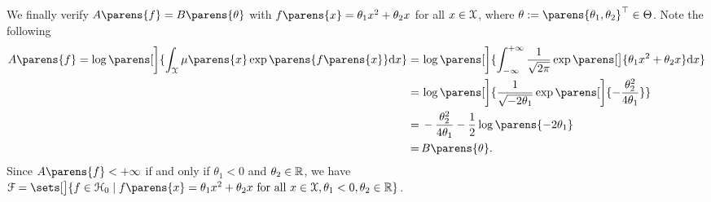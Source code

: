 \begin{example}
	We finally verify $A \parens{f} = B \parens{\theta}$ with $f \parens{x} = \theta_1 x^2 + \theta_2 x$ for all $x \in \mathcal{X}$, where $\theta := \parens{\theta_1, \theta_2}^\top \in \Theta$. Note the following 
	\begin{align*}
		A \parens{f} = \log \parens[\bigg]{\int_{\calX} \mu \parens{x} \exp \parens{f \parens{x}}\diff x} 
		= & \, \log \parens[\bigg]{\int_{-\infty}^{+\infty} \frac{1}{\sqrt{2 \pi}} \exp \parens[\big]{\theta_1 x^2 + \theta_2 x} \diff x} \\ 
		= & \, \log \parens[\bigg]{ \frac{1}{\sqrt{-2\theta_1}} \exp \parens[\bigg]{ - \frac{\theta_2^2}{4\theta_1}} } \\ 
		= & \, - \frac{\theta_2^2}{4\theta_1} - \frac{1}{2} \log\parens{-2\theta_1} \\ 
		= & \, B \parens{\theta}. 
	\end{align*}
	Since $A \parens{f} < + \infty$ if and only if $\theta_1 < 0$ and $\theta_2 \in \mathbb{R}$, we have $\calF = \sets[\big]{f \in \calH_0 \mid f \parens{x} = \theta_1 x^2 + \theta_2 x \text{ for all } x \in \calX, \theta_1 < 0, \theta_2 \in \Real}$. 
\end{example}


